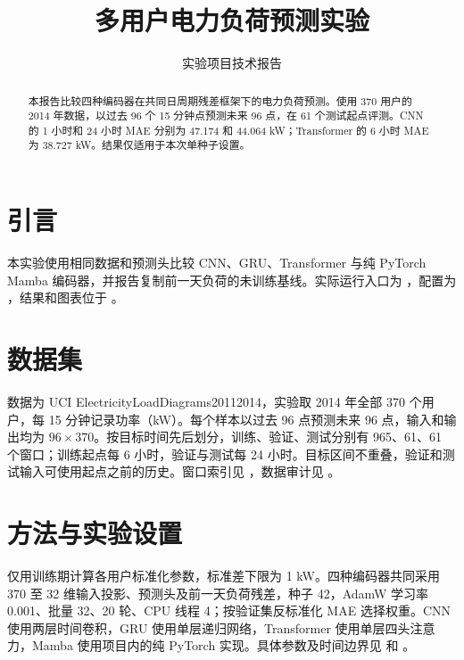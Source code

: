\documentclass[sigconf]{acmart}
\begin{document}
\title{多用户电力负荷预测实验}
\author{实验项目技术报告}
\begin{abstract}
本报告比较四种编码器在共同日周期残差框架下的电力负荷预测。使用 370 用户的 2014 年数据，以过去 96 个 15 分钟点预测未来 96 点，在 61 个测试起点评测。CNN 的 1 小时和 24 小时 MAE 分别为 47.174 和 44.064 kW；Transformer 的 6 小时 MAE 为 38.727 kW。结果仅适用于本次单种子设置。
\end{abstract}
\maketitle
\pagestyle{plain}
\suppressfloats[t]




\section{引言}
本实验使用相同数据和预测头比较 CNN、GRU、Transformer 与纯 PyTorch Mamba 编码器，并报告复制前一天负荷的未训练基线。实际运行入口为 ，配置为 ，结果和图表位于 。
\section{数据集}
数据为 UCI ElectricityLoadDiagrams20112014，实验取 2014 年全部 370 个用户，每 15 分钟记录功率（kW）。每个样本以过去 96 点预测未来 96 点，输入和输出均为 $96\times370$。按目标时间先后划分，训练、验证、测试分别有 965、61、61 个窗口；训练起点每 6 小时，验证与测试每 24 小时。目标区间不重叠，验证和测试输入可使用起点之前的历史。窗口索引见 ，数据审计见 。
\section{方法与实验设置}
仅用训练期计算各用户标准化参数，标准差下限为 1 kW。四种编码器共同采用 370 至 32 维输入投影、预测头及前一天负荷残差，种子 42，AdamW 学习率 0.001、批量 32、20 轮、CPU 线程 4；按验证集反标准化 MAE 选择权重。CNN 使用两层时间卷积，GRU 使用单层递归网络，Transformer 使用单层四头注意力，Mamba 使用项目内的纯 PyTorch 实现。具体参数及时间边界见  和 。
\end{document}
